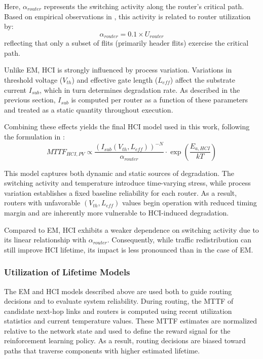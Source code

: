 Here, $\alpha_{router}$ represents the switching activity along the router’s critical path. Based on empirical observations in \cite{Clotho2015}, this activity is related to router utilization by:
\begin{equation}
\alpha_{router} = 0.1 \times U_{router}
\end{equation}
reflecting that only a subset of flits (primarily header flits) exercise the critical path.

Unlike EM, HCI is strongly influenced by process variation. Variations in threshold voltage ($V_{th}$) and effective gate length ($L_{eff}$) affect the substrate current $I_{sub}$, which in turn determines degradation rate. As described in the previous section, $I_{sub}$ is computed per router as a function of these parameters and treated as a static quantity throughout execution.

Combining these effects yields the final HCI model used in this work, following the formulation in \cite{Clotho2015}:
\begin{equation}
MTTF_{HCI,PV} \propto \frac{(I_{sub}(V_{th}, L_{eff}))^{-N}}{\alpha_{router}} \cdot \exp\left(\frac{E_{a,HCI}}{kT}\right)
\end{equation}

This model captures both dynamic and static sources of degradation. The switching activity and temperature introduce time-varying stress, while process variation establishes a fixed baseline reliability for each router. As a result, routers with unfavorable $(V_{th}, L_{eff})$ values begin operation with reduced timing margin and are inherently more vulnerable to HCI-induced degradation.

Compared to EM, HCI exhibits a weaker dependence on switching activity due to its linear relationship with $\alpha_{router}$. Consequently, while traffic redistribution can still improve HCI lifetime, its impact is less pronounced than in the case of EM.

\subsubsection{Utilization of Lifetime Models}

The EM and HCI models described above are used both to guide routing decisions and to evaluate system reliability. During routing, the MTTF of candidate next-hop links and routers is computed using recent utilization statistics and current temperature values. These MTTF estimates are normalized relative to the network state and used to define the reward signal for the reinforcement learning policy. As a result, routing decisions are biased toward paths that traverse components with higher estimated lifetime.

